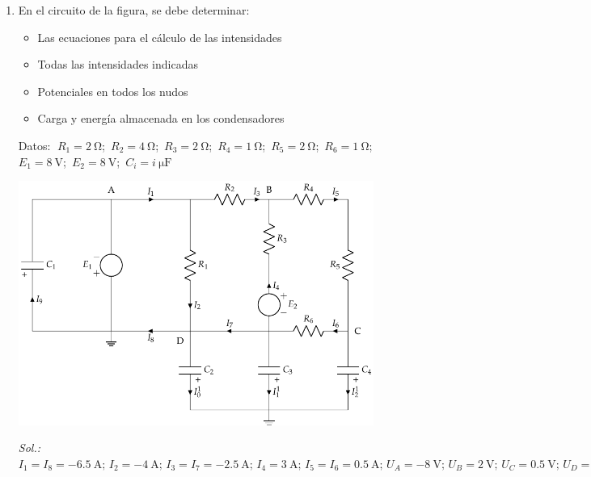 \begin{enumerate}
  \emph{Sol.:\;
    $I_1=\qty{40}{\ampere};\, I_2=\qty{-86}{\ampere};\, I_3=\qty{32}{\ampere};\, I_4=\qty{14}{\ampere};\, I_5=\qty{54}{\ampere};\, U_A=U_B=\qty{0}{\volt};\,
    U_C=\qty{42}{\volt};\, U_D=\qty{150}{\volt};\, U_{C1}=\qty{0}{\volt};\, q_1=\qty{0}{\coulomb};\, E_{C1}=\qty{0}{\joule};\, U_{C2}=\qty{-42}{\volt};\,
    q_2=\qty{84}{\micro\coulomb};\, E_{C2}=\qty{1.76}{\milli\joule};\, U_{C3}=\qty{-42}{\volt};\, q_3=\qty{84}{\micro\coulomb};\, E_{C3}=\qty{1.76}{\milli\joule};\, P_g = P_R$}

\item En el circuito de la figura, se debe determinar:
  \begin{itemize}
  \item Las ecuaciones para el cálculo de las intensidades
  \item Todas las intensidades indicadas
  \item Potenciales en todos los nudos
  \item Carga y energía almacenada en los condensadores
  \end{itemize}

  Datos: $\; R_1 = \qty{2}{\ohm}$;\, $R_2 = \qty{4}{\ohm}$;\, $R_3 = \qty{2}{\ohm}$;\, $R_4 = \qty{1}{\ohm}$;\, $R_5 = \qty{2}{\ohm}$;\, $R_6 = \qty{1}{\ohm}$;\, $E_1 = \qty{8}{\volt}$;\, $E_2 = \qty{8}{\volt}$;\, $C_i = \qty[parse-numbers=false]{i}{\micro\farad}$
  
  \begin{center}
    \includegraphics[height=8cm]{../figs/ej11_BT1.pdf}
  \end{center}

  \emph{Sol.:\;
    $I_1=I_8=\qty{-6.5}{\ampere};\, I_2=\qty{-4}{\ampere};\, I_3=I_7=\qty{-2.5}{\ampere};\, I_4=\qty{3}{\ampere};\, I_5=I_6=\qty{0.5}{\ampere};\, U_A=\qty{-8}{\volt};\,
    U_B=\qty{2}{\volt};\, U_C=\qty{0.5}{\volt};\, U_D=\qty{0}{\volt};\, Q_{1\si{\micro\farad}}=\qty{8}{\micro\coulomb};\, Q_{2\si{\micro\farad}}=Q_{3\si{\micro\farad}}=\qty{0}{\micro\coulomb};\, Q_{4\si{\micro\farad}}=\qty{-2}{\micro\coulomb};\, E_{1\si{\micro\farad}}=\qty{32}{\micro\joule};\, E_{2\si{\micro\farad}}=E_{3\si{\micro\farad}}=\qty{0}{\joule};\, E_{4\si{\micro\farad}}=\qty{0.5}{\micro\joule}$}


\end{enumerate}
